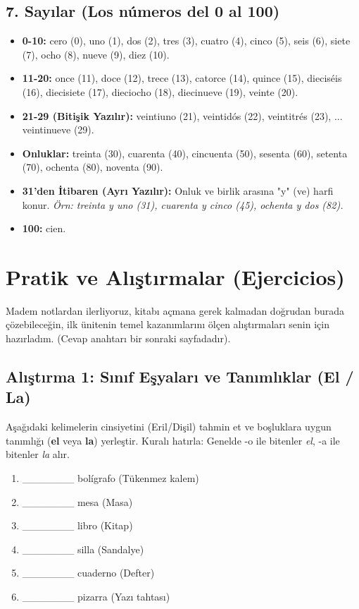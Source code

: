 \documentclass[12pt,a4paper]{article}
\begin{document}
\subsection{7. Sayılar (Los números del 0 al 100)}
\begin{itemize}
    \item \textbf{0-10:} cero (0), uno (1), dos (2), tres (3), cuatro (4), cinco (5), seis (6), siete (7), ocho (8), nueve (9), diez (10).
    \item \textbf{11-20:} once (11), doce (12), trece (13), catorce (14), quince (15), dieciséis (16), diecisiete (17), dieciocho (18), diecinueve (19), veinte (20).
    \item \textbf{21-29 (Bitişik Yazılır):} veintiuno (21), veintidós (22), veintitrés (23), ... veintinueve (29).
    \item \textbf{Onluklar:} treinta (30), cuarenta (40), cincuenta (50), sesenta (60), setenta (70), ochenta (80), noventa (90).
    \item \textbf{31'den İtibaren (Ayrı Yazılır):} Onluk ve birlik arasına "y" (ve) harfi konur. \textit{Örn: treinta y uno (31), cuarenta y cinco (45), ochenta y dos (82).}
    \item \textbf{100:} cien.
\end{itemize}

\newpage
\newpage
\section{Pratik ve Alıştırmalar (Ejercicios)}
Madem notlardan ilerliyoruz, kitabı açmana gerek kalmadan doğrudan burada çözebileceğin, ilk ünitenin temel kazanımlarını ölçen alıştırmaları senin için hazırladım. (Cevap anahtarı bir sonraki sayfadadır).

\subsection{Alıştırma 1: Sınıf Eşyaları ve Tanımlıklar (El / La)}
Aşağıdaki kelimelerin cinsiyetini (Eril/Dişil) tahmin et ve boşluklara uygun tanımlığı (\textbf{el} veya \textbf{la}) yerleştir. Kuralı hatırla: Genelde -o ile bitenler \textit{el}, -a ile bitenler \textit{la} alır.
\begin{enumerate}
    \item \_\_\_\_\_\_\_ bolígrafo (Tükenmez kalem)
    \item \_\_\_\_\_\_\_ mesa (Masa)
    \item \_\_\_\_\_\_\_ libro (Kitap)
    \item \_\_\_\_\_\_\_ silla (Sandalye)
    \item \_\_\_\_\_\_\_ cuaderno (Defter)
    \item \_\_\_\_\_\_\_ pizarra (Yazı tahtası)
\end{enumerate}
\end{document}
